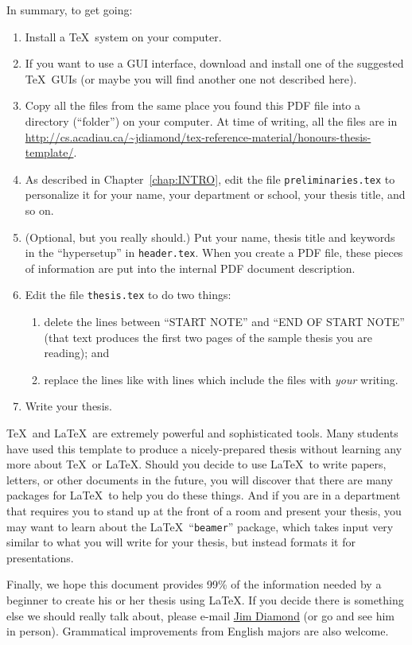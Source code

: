 In summary, to get going:
\begin{enumerate}
    \itemsep0pt
    \item Install a \TeX\ system on your computer.
    \item If you want to use a GUI interface, download and install one
      of the suggested \TeX\ GUIs (or maybe you will find another one
      not described here).
    \item Copy all the files from the same place you found this PDF
      file into a directory (``folder'') on your computer.  At time of
      writing, all the files are in
      \url{http://cs.acadiau.ca/~jdiamond/tex-reference-material/honours-thesis-template/}.
    \item As described in Chapter~\ref{chap:INTRO}, edit the file
      \verb|preliminaries.tex| to personalize it for your name, your
      department or school, your thesis title, and so on.
    \item (Optional, but you really should.) Put your name, thesis
      title and keywords in the ``hypersetup'' in \verb|header.tex|.
      When you create a PDF file, these pieces of information are put
      into the internal PDF document description.
    \item Edit the file \verb|thesis.tex| to do two things:
    \begin{enumerate}
    \item delete the lines between ``START NOTE'' and ``END OF START
      NOTE'' (that text produces the first two pages of the sample
      thesis you are reading); and
    \item replace the lines like \verb|| with
      lines which include the files with \emph{your} writing.
    \end{enumerate}
    \item Write your thesis.
\end{enumerate}

\TeX\ and \LaTeX\ are extremely powerful and sophisticated tools.
Many students have used this template to produce a nicely-prepared
thesis without learning any more about \TeX\ or \LaTeX{}.  Should you
decide to use \LaTeX\ to write papers, letters, or other documents in
the future, you will discover that there are many packages for
\LaTeX\ to help you do these things.  And if you are in a department
that requires you to stand up at the front of a room and present your
thesis, you may want to learn about the \LaTeX\ ``\verb|beamer|''
package, which takes input very similar to what you will write for
your thesis, but instead formats it for presentations.

Finally, we hope this document provides 99\% of the information needed
by a beginner to create his or her thesis using \LaTeX.  If you decide
there is something else we should really talk about, please e-mail
\href{mailto:jim.diamond@acadiau.ca}{Jim Diamond} (or go and see him
in person).  Grammatical improvements from English majors are also
welcome.
